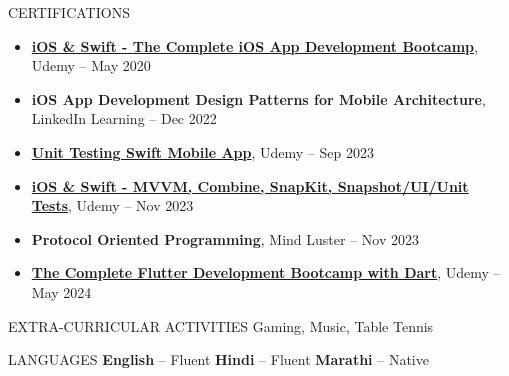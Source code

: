 \documentclass{resume} %
\begin{document}

\begin{rSection}{CERTIFICATIONS}
\begin{itemize}
    \itemsep -3pt
    \item \href{https://www.udemy.com/certificate/UC-7dad647d-9892-40ce-a38e-29a6eec0a7e6/}{\textbf{iOS \& Swift - The Complete iOS App Development Bootcamp}}, Udemy -- May 2020
    \item \textbf{iOS App Development Design Patterns for Mobile Architecture}, LinkedIn Learning -- Dec 2022
    \item \href{https://www.udemy.com/certificate/UC-e9bee7b7-80ef-4f80-9ee1-66978e4a3c7c/}{\textbf{Unit Testing Swift Mobile App}}, Udemy -- Sep 2023
    \item \href{https://www.udemy.com/certificate/UC-f2ec7f74-ad15-47b1-a454-3f1aafada18a/}{\textbf{iOS \& Swift - MVVM, Combine, SnapKit, Snapshot/UI/Unit Tests}}, Udemy -- Nov 2023
    \item \textbf{Protocol Oriented Programming}, Mind Luster -- Nov 2023
    \item \href{https://www.udemy.com/certificate/UC-98ad5b06-9010-43be-89f4-3453ede37470/}{\textbf{The Complete Flutter Development Bootcamp with Dart}}, Udemy -- May 2024
\end{itemize}
\end{rSection}


\begin{rSection}{EXTRA-CURRICULAR ACTIVITIES}
Gaming, Music, Table Tennis
\end{rSection}



\begin{rSection}{LANGUAGES}
\textbf{English} -- Fluent \hspace{0.5cm}
\textbf{Hindi} -- Fluent \hspace{0.5cm}
\textbf{Marathi} -- Native
\end{rSection}
\end{document}
